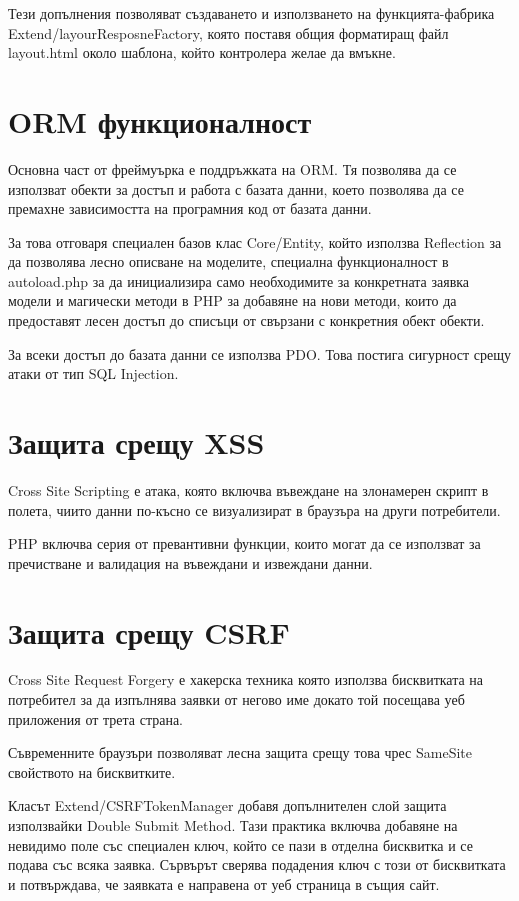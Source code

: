 Тези допълнения позволяват създаването и използването на
функцията-фабрика Extend/layourResposneFactory,
която поставя общия форматиращ файл layout.html около
шаблона, който контролера желае да вмъкне.


\section{ORM функционалност}

Основна част от фреймуърка е поддръжката на ORM.
Тя позволява да се използват обекти за достъп и работа
с базата данни, което позволява да се премахне
зависимостта на програмния код от базата данни.

За това отговаря специален базов клас Core/Entity,
който използва Reflection за да позволява лесно описване
на моделите, специална функционалност в autoload.php за
да инициализира само необходимите за конкретната заявка
модели и магически методи в PHP за добавяне на нови
методи, които да предоставят лесен достъп до списъци от
свързани с конкретния обект обекти.

За всеки достъп до базата данни се използва PDO. Това
постига сигурност срещу атаки от тип SQL Injection.


\section{Защита срещу XSS}

Cross Site Scripting е атака, която включва въвеждане на
злонамерен скрипт в полета, чиито данни по-късно се
визуализират в браузъра на други потребители.

PHP включва серия от превантивни функции, които могат
да се използват за пречистване и валидация на въвеждани
и извеждани данни.


\section{Защита срещу CSRF}

Cross Site Request Forgery е хакерска техника която
използва бисквитката на потребител за да изпълнява
заявки от негово име докато той посещава уеб приложения
от трета страна.

Съвременните браузъри позволяват лесна защита срещу това
чрес SameSite свойството на бисквитките.

Класът Extend/CSRFTokenManager добавя допълнителен слой
защита използвайки Double Submit Method. Тази практика
включва добавяне на невидимо поле със специален ключ,
който се пази в отделна бисквитка и се подава със всяка
заявка. Сървърът сверява подадения ключ с този от
бисквитката и потвърждава, че заявката е направена от
уеб страница в същия сайт.

